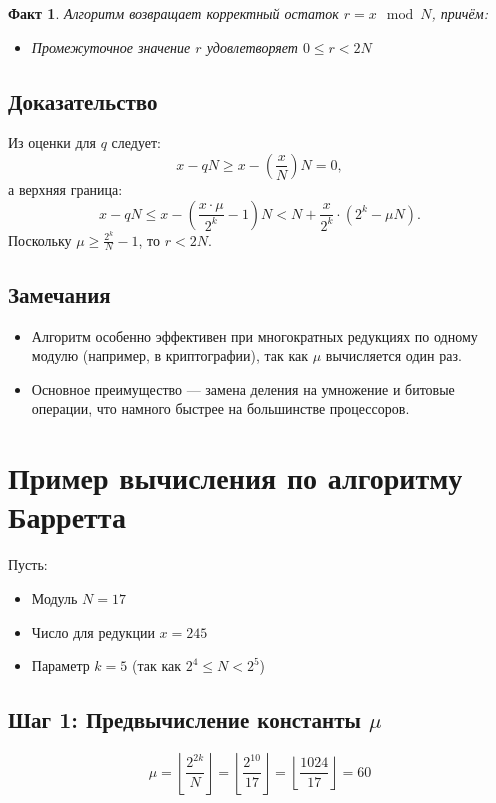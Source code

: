 \documentclass[12pt,a4paper]{article}
\newtheorem{fact}{Факт}
\begin{document}
\begin{fact}
Алгоритм возвращает корректный остаток $r = x \mod N$, причём:
\begin{itemize}
    \item Промежуточное значение $r$ удовлетворяет $0 \leq r < 2N$
\end{itemize}
\end{fact}

\subsection{Доказательство}
Из оценки для $q$ следует:
\[ x - qN \geq x - \left(\frac{x}{N}\right)N = 0, \]
а верхняя граница:
\[ x - qN \leq x - \left(\frac{x \cdot \mu}{2^k} - 1\right)N < N + \frac{x}{2^k} \cdot (2^k - \mu N). \]
Поскольку $\mu \geq \frac{2^k}{N} - 1$, то $r < 2N$.
\subsection{Замечания}
\begin{itemize}
    \item Алгоритм особенно эффективен при многократных редукциях по одному модулю (например, в криптографии), так как $\mu$ вычисляется один раз.
    \item Основное преимущество — замена деления на умножение и битовые операции, что намного быстрее на большинстве процессоров.
\end{itemize}

\section{Пример вычисления по алгоритму Барретта}

Пусть:
\begin{itemize}
    \item Модуль $N = 17$
    \item Число для редукции $x = 245$
    \item Параметр $k = 5$ (так как $2^4 \leq N < 2^5$)
\end{itemize}

\subsection{Шаг 1: Предвычисление константы $\mu$}
\[
\mu = \left\lfloor \frac{2^{2k}}{N} \right\rfloor = \left\lfloor \frac{2^{10}}{17} \right\rfloor = \left\lfloor \frac{1024}{17} \right\rfloor = 60
\]
\end{document}
